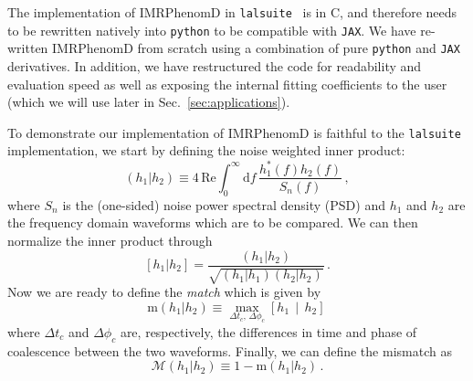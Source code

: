 \documentclass[twocolumn]{aastex631}
\newcommand{\jax}{\texttt{JAX}\xspace}
\newcommand{\lalsuite}{\texttt{lalsuite}\xspace}
\begin{document}
The implementation of IMRPhenomD in \lalsuite~\citep{lalsuite} is in C, and therefore needs to be rewritten natively into \texttt{python} to be compatible with \jax.
We have re-written IMRPhenomD from scratch using a combination of pure \texttt{python} and \jax derivatives.
In addition, we have restructured the code for readability and evaluation speed as well as exposing the internal fitting coefficients to the user (which we will use later in Sec.~\ref{sec:applications}).

To demonstrate our implementation of IMRPhenomD is faithful to the \lalsuite implementation, we start by defining the noise weighted inner product:
\begin{equation}
    \label{eq:inner_prod}
    \left(h_1|h_2\right) \equiv 4 \, \mathrm{Re} \int^{\infty}_{0} \mathrm{d} f \, \frac{ h^*_1(f) h_2(f)}{S_n(f)}\, ,
\end{equation}
where $S_n$ is the (one-sided) noise power spectral density (PSD) and $h_1$ and $h_2$ are the frequency domain waveforms which are to be compared.
We can then normalize the inner product through
\begin{equation}
    \left[h_1|h_2\right] = \frac{\left(h_1|h_2\right)}{\sqrt{\left(h_1|h_1\right)\left(h_2|h_2\right)}}\, .
\end{equation}
Now we are ready to define the \textit{match} which is given by 
\begin{equation}
    \mathrm{m}(h_1|h_2) \equiv \max_{\Delta t_c,\, \Delta \phi_c} \left[h_1 \, \middle| \, h_2 \right]\,
\end{equation}
where $\Delta t_c$ and $\Delta \phi_c$ are, respectively, the differences in time and phase of coalescence between the two waveforms.
Finally, we can define the mismatch as 
\begin{equation}
    \label{eq:mismatch_1}
	\mathcal{M}(h_1|h_2) \equiv 1- \mathrm{m}(h_1|h_2)\,.
\end{equation}
\end{document}
